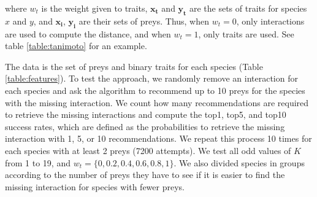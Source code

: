 \documentclass[letterpaper]{article}
\begin{document}
where $w_t$ is the weight given to traits, $\mathbf{x_t}$ and $\mathbf{y_t}$
are the sets of traits for species $x$ and $y$, and $\mathbf{x_i}$,
$\mathbf{y_i}$ are their sets of preys. Thus, when $w_t = 0$, only interactions
are used to compute the distance, and when $w_t = 1$, only traits are used. See
table \ref{table:tanimoto} for an example.

The data is the set of preys and binary traits for each species (Table
\ref{table:features}). To test the approach, we randomly remove an interaction
for each species and ask the algorithm to recommend up to 10 preys for the
species with the missing interaction. We count how many recommendations are
required to retrieve the missing interactions and compute the top1, top5, and
top10 success rates, which are defined as the probabilities to retrieve the
missing interaction with 1, 5, or 10 recommendations. We repeat this process 10
times for each species with at least 2 preys (7200 attempts). We test all odd
values of $K$ from 1 to 19, and $w_t = \{0, 0.2, 0.4, 0.6, 0.8, 1\}$. We also
divided species in groups according to the number of preys they have to see if
it is easier to find the missing interaction for species with fewer preys.
\end{document}
